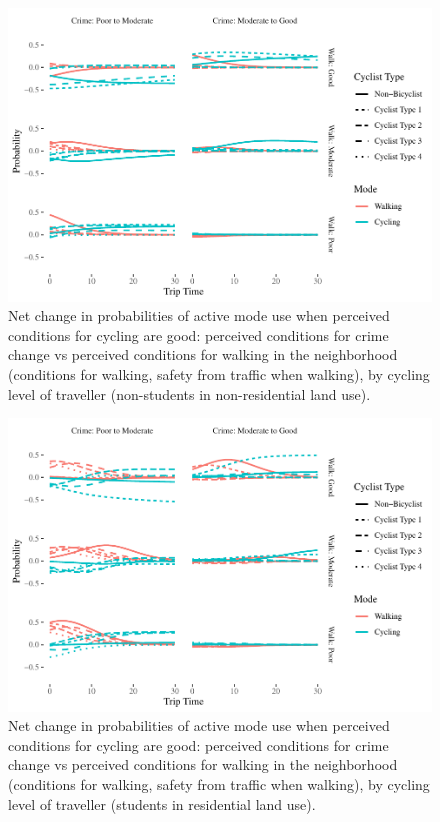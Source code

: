 \documentclass[]{elsarticle} %
\makeatletter
\def\maxwidth{\ifdim\Gin@nat@width>\linewidth\linewidth
\else\Gin@nat@width\fi}
\let\Oldincludegraphics\includegraphics
\renewcommand{\includegraphics}[1]{\Oldincludegraphics[width=\maxwidth]{#1}}
\makeatother
\begin{document}
\begin{figure}
\centering
\includegraphics{Active-Travel-in-Bangladesh_files/figure-latex/figure-comparison-crime-perceptions-change-active-non-students-non-residential-1.pdf}
\caption{\label{fig:comparison-crime-perceptions-change-active-non-students-non-residential}Net
change in probabilities of active mode use when perceived conditions for
cycling are good: perceived conditions for crime change vs perceived
conditions for walking in the neighborhood (conditions for walking,
safety from traffic when walking), by cycling level of traveller
(non-students in non-residential land use).}
\end{figure}

\begin{figure}
\centering
\includegraphics{Active-Travel-in-Bangladesh_files/figure-latex/figure-comparison-crime-perceptions-change-active-students-residential-1.pdf}
\caption{\label{fig:comparison-crime-perceptions-change-active-students-residential}Net
change in probabilities of active mode use when perceived conditions for
cycling are good: perceived conditions for crime change vs perceived
conditions for walking in the neighborhood (conditions for walking,
safety from traffic when walking), by cycling level of traveller
(students in residential land use).}
\end{figure}
\end{document}
